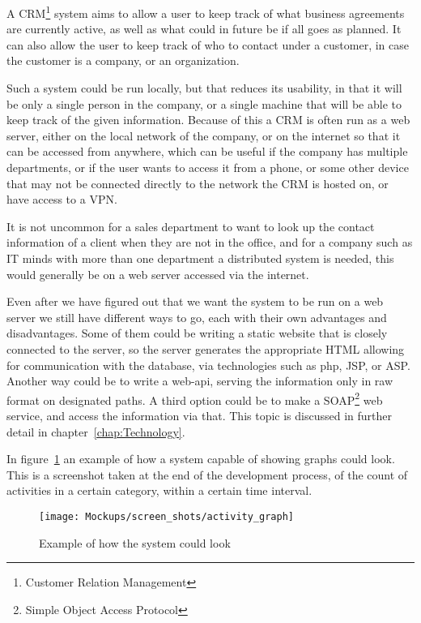 A CRM\footnote{Customer Relation Management} system aims to allow a user to keep
track of what business agreements are currently active, as well as what could in
future be if all goes as planned. It can also allow the user to keep track of
who to contact under a customer, in case the customer is a company, or an
organization. 

Such a system could be run locally, but that reduces its usability, in that it
will be only a single person in the company, or a single machine that will be
able to keep track of the given information. Because of this a CRM is often run
as a web server, either on the local network of the company, or on the internet
so that it can be accessed from anywhere, which can be useful if the company has
multiple departments, or if the user wants to access it from a phone, or some
other device that may not be connected directly to the network the CRM is hosted
on, or have access to a VPN. 

It is not uncommon for a sales department to want to look up the contact
information of a client when they are not in the office, and for a company such
as IT minds with more than one department a distributed system is needed, this 
would generally be on a web server accessed via the internet. 

Even after we have figured out that we want the system to be run on a web server
we still have different ways to go, each with their own advantages and
disadvantages. Some of them could be writing a static website that is closely
connected to the server, so the server generates the appropriate HTML allowing
for communication with the database, via technologies such as php, JSP, or ASP.
Another way could be to write a web-api, serving the information only in raw
format on designated paths. A third option could be to make a
SOAP\footnote{Simple Object Access Protocol} web service, and access the
information via that. This topic is discussed in further detail in
chapter~\ref{chap:Technology}. 

In figure~\ref{fig:sys_example} an example of how a system capable of showing
graphs could look. This is a screenshot taken at the end of the development
process, of the count of activities in a certain category, within a certain time interval.

\begin{figure}[h]
\centering
\texttt{[image: Mockups/screen\_shots/activity\_graph]}
\caption{Example of how the system could look}
\label{fig:sys_example}
\end{figure}

